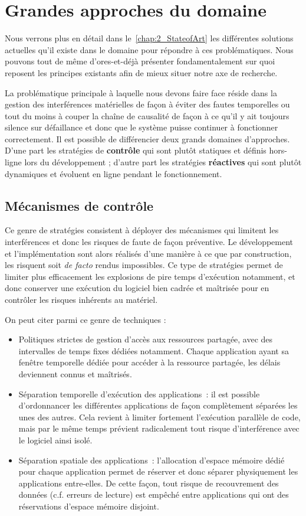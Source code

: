 \documentclass[french, a4paper, 11pt, twoside, pdftex]{StyleThese}
\begin{document}
	
\section{Grandes approches du domaine}

	Nous verrons plus en détail dans le~\autoref{chap:2_StateofArt} les différentes solutions actuelles qu'il existe dans le domaine pour répondre à ces problématiques. Nous pouvons tout de même d'ores-et-déjà présenter fondamentalement sur quoi reposent les principes existants afin de mieux situer notre axe de recherche.
	
	La problématique principale à laquelle nous devons faire face réside dans la gestion des interférences matérielles de façon à éviter des fautes temporelles ou tout du moins à couper la chaîne de causalité de façon à ce qu'il y ait toujours silence sur défaillance et donc que le système puisse continuer à fonctionner correctement. Il est possible de différencier deux grands domaines d'approches. D'une part les stratégies de \textbf{contrôle} qui sont plutôt statiques et définis hors-ligne lors du développement ; d'autre part les stratégies \textbf{réactives} qui sont plutôt dynamiques et évoluent en ligne pendant le fonctionnement.
	
	\subsection{Mécanismes de contrôle}
		Ce genre de stratégies consistent à déployer des mécanismes qui limitent les interférences et donc les risques de faute de façon préventive. Le développement et l'implémentation sont alors réalisés d'une manière à ce que par construction, les risquent soit \textit{de facto} rendus impossibles.
		Ce type de stratégies permet de limiter plus efficacement les explosions de pire temps d'exécution notamment, et donc conserver une exécution du logiciel bien cadrée et maîtrisée pour en contrôler les risques inhérents au matériel. 
		
		On peut citer parmi ce genre de techniques : 
		\begin{itemize}
		\item 			Politiques strictes de gestion d'accès aux ressources partagée, avec des intervalles de temps fixes dédiées notamment. Chaque application ayant sa fenêtre temporelle dédiée pour accéder à la ressource partagée, les délais deviennent connus et maîtrisés.
		\item 			Séparation temporelle d'exécution des applications~: il est possible d'ordonnancer les différentes applications de façon complètement séparées les unes des autres. Cela revient à limiter fortement l'exécution parallèle de code, mais par le même temps prévient radicalement tout risque d'interférence avec le logiciel ainsi isolé.
		\item 			Séparation spatiale des applications~: l'allocation d'espace mémoire dédié pour chaque application permet de réserver et donc séparer physiquement les applications entre-elles. De cette façon, tout risque de recouvrement des données (c.f. erreurs de lecture) est empêché entre applications qui ont des réservations d'espace mémoire disjoint.
		\end{itemize}
		
\end{document}
